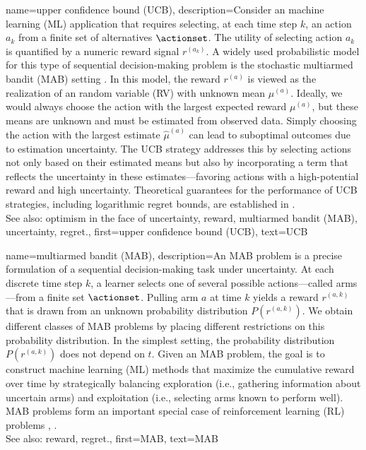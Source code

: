{
{name={upper confidence bound (UCB)},
	description={Consider an machine learning (ML) 
		application that requires selecting, at each time step $k$, an action $a_{k}$ 
		from a finite set of alternatives $\actionset$. The utility of selecting action $a_{k}$ 
		is quantified by a numeric reward signal $r^{(a_{k})}$. 
		A widely used probabilistic model for this type of sequential decision-making problem 
		is the stochastic multiarmed bandit (MAB) setting \cite{Bubeck2012}. In this model, 
		the reward $r^{(a)}$ is viewed as the realization of an random variable (RV) 
		with unknown mean $\mu^{(a)}$. Ideally, we would always choose the 
		action with the largest expected reward $\mu^{(a)}$, but these 
		means are unknown and must be estimated from observed data. Simply 
		choosing the action with the largest estimate $\widehat{\mu}^{(a)}$ can 
		lead to suboptimal outcomes due to estimation uncertainty. The UCB strategy 
		addresses this by selecting actions not only based on their estimated means but 
		also by incorporating a term that reflects the uncertainty in these estimates—favoring 
		actions with a high-potential reward and high uncertainty. Theoretical guarantees 
		for the performance of UCB strategies, including logarithmic regret bounds, are established in \cite{Bubeck2012}.
					\\ 
		See also: optimism in the face of uncertainty, reward, multiarmed bandit (MAB), uncertainty, regret.},
	first={upper confidence bound (UCB)},
	text={UCB} 
}

{name={multiarmed bandit (MAB)},
	description={An MAB  problem is a precise 
	formulation of a sequential decision-making task under uncertainty. At each 
	discrete time step $k$, a learner selects one of several possible 
	actions—called arms—from a finite set $\actionset$. Pulling arm $a$ at time 
	$k$ yields a reward $r^{(a,k)}$ that is drawn from an unknown 
	probability distribution $P\left(r^{(a,k)}\right)$. We obtain different classes 
	of MAB problems by placing different restrictions on this probability distribution. In the simplest 
	setting, the probability distribution $P\left(r^{(a,k)}\right)$ does not depend on $t$. 
		Given an MAB problem, the goal is to construct machine learning (ML) methods that maximize the cumulative 
		reward over time by strategically balancing exploration (i.e., gathering information 
		about uncertain arms) and exploitation (i.e., selecting arms known to perform well). 
		MAB problems form an important special case of reinforcement learning (RL) problems \cite{Bubeck2012}, \cite{SuttonEd2}.
					\\ 
		See also: reward, regret.},
	first={MAB},
	text={MAB}
}



}
